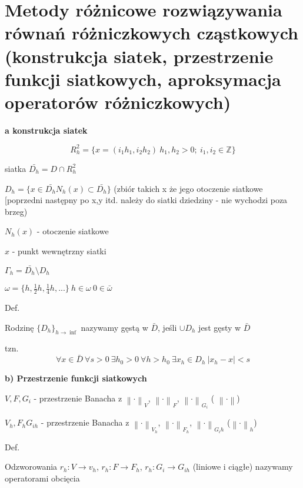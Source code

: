 \section{Metody różnicowe rozwiązywania równań różniczkowych cząstkowych (konstrukcja siatek, przestrzenie funkcji siatkowych, aproksymacja operatorów różniczkowych)}

\textbf{a\) konstrukcja siatek}

\[R^{2}_{h} = \{ x = (i_{1}h_{1}, i_{2}h_{2})\ h_{1},h_{2} > 0;\ i_{1},i_{2} \in \mathbb{Z}\}\]

siatka $\bar{D_{h}} = D \cap R^{2}_{h}$

$D_{h} = \{ x \in \bar{D_{h}} N_h(x) \subset \bar{D_{h}}\}$ (zbiór takich x że jego otoczenie siatkowe [poprzedni następny po x,y itd. należy do siatki dziedziny - nie wychodzi poza brzeg)

$N_h(x)$ - otoczenie siatkowe

$x$ - punkt wewnętrzny siatki

$\Gamma_h = \bar{D_h} \setminus D_h$

$\omega = \{h, \frac{1}{2}h, \frac{1}{4}h, ...\}\ h \in \omega\ 0 \in \bar{\omega}$

Def.

Rodzinę $\{D_h\}_{h \rightarrow \inf}$ nazywamy gęstą w $\bar{D}$, jeśli $\cup D_h$ jest gęsty w $\bar{D}$

tzn.
\[\forall x \in \bar{D}\ \forall s > 0\ \exists h_0 > 0\ \forall h > h_0\ \exists x_h \in D_h\ |x_h - x| < s\]

\textbf{b) Przestrzenie funkcji siatkowych}

$V, F, G_i$ - przestrzenie Banacha z $\left \| \cdot \right \|_V$, $\left \| \cdot \right \|_F$, $\left \| \cdot \right \|_{G_i}$ ( $\left \| \cdot \right \|$)

$V_h, F_h G_{ih}$ - przestrzenie Banacha z $\left \| \cdot \right \|_{V_h}$, $\left \| \cdot \right \|_{F_h}$, $\left \| \cdot \right \|_{G_ih}$ ($\left \| \cdot \right \|_h$)

Def.

Odzworowania $r_h: V \rightarrow v_h$, $r_h: F \rightarrow F_h$, $r_h: G_i \rightarrow G_{ih}$ (liniowe i ciągłe) nazywamy operatorami obcięcia
